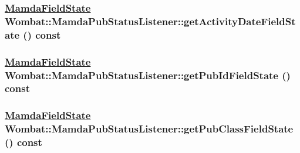 \hypertarget{classWombat_1_1MamdaPubStatusListener_978079b77f029cc821ff70b4b381f80f}{
\subsubsection[getActivityDateFieldState]{\setlength{\rightskip}{0pt plus 5cm}\hyperlink{namespaceWombat_93aac974f2ab713554fd12a1fa3b7d2a}{Mamda\-Field\-State} Wombat::Mamda\-Pub\-Status\-Listener::get\-Activity\-Date\-Field\-State () const}}
\label{classWombat_1_1MamdaPubStatusListener_978079b77f029cc821ff70b4b381f80f}


\hypertarget{classWombat_1_1MamdaPubStatusListener_b6166da7512cfa7b06bb971eb945a39a}{
\subsubsection[getPubIdFieldState]{\setlength{\rightskip}{0pt plus 5cm}\hyperlink{namespaceWombat_93aac974f2ab713554fd12a1fa3b7d2a}{Mamda\-Field\-State} Wombat::Mamda\-Pub\-Status\-Listener::get\-Pub\-Id\-Field\-State () const}}
\label{classWombat_1_1MamdaPubStatusListener_b6166da7512cfa7b06bb971eb945a39a}


\hypertarget{classWombat_1_1MamdaPubStatusListener_ffcb6fab4b381b52cdfe3483f2e2965c}{
\subsubsection[getPubClassFieldState]{\setlength{\rightskip}{0pt plus 5cm}\hyperlink{namespaceWombat_93aac974f2ab713554fd12a1fa3b7d2a}{Mamda\-Field\-State} Wombat::Mamda\-Pub\-Status\-Listener::get\-Pub\-Class\-Field\-State () const}}
\label{classWombat_1_1MamdaPubStatusListener_ffcb6fab4b381b52cdfe3483f2e2965c}


